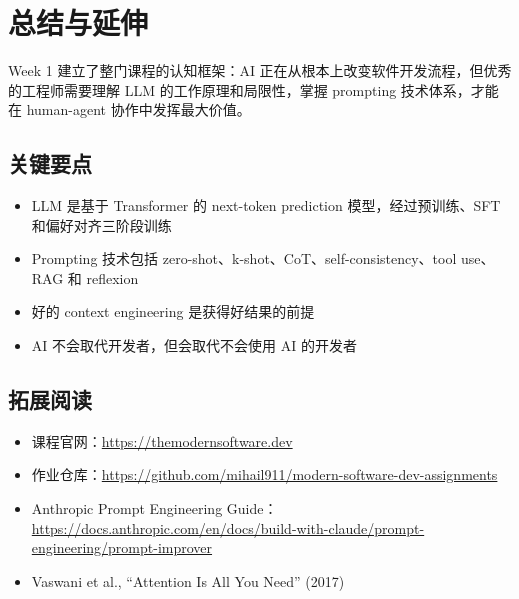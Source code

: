 \documentclass[a4paper]{article}
\begin{document}
\section{总结与延伸}

Week 1 建立了整门课程的认知框架：AI 正在从根本上改变软件开发流程，但优秀的工程师需要理解 LLM 的工作原理和局限性，掌握 prompting 技术体系，才能在 human-agent 协作中发挥最大价值。

\subsection{关键要点}

\begin{itemize}
    \item LLM 是基于 Transformer 的 next-token prediction 模型，经过预训练、SFT 和偏好对齐三阶段训练
    \item Prompting 技术包括 zero-shot、k-shot、CoT、self-consistency、tool use、RAG 和 reflexion
    \item 好的 context engineering 是获得好结果的前提
    \item AI 不会取代开发者，但会取代不会使用 AI 的开发者
\end{itemize}

\subsection{拓展阅读}

\begin{itemize}
    \item 课程官网：\url{https://themodernsoftware.dev}
    \item 作业仓库：\url{https://github.com/mihail911/modern-software-dev-assignments}
    \item Anthropic Prompt Engineering Guide：\url{https://docs.anthropic.com/en/docs/build-with-claude/prompt-engineering/prompt-improver}
    \item Vaswani et al., ``Attention Is All You Need'' (2017)
\end{itemize}

\end{document}

